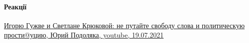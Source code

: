  
 
 
 
 
\paragraph{Реакції}
\label{sec:14_07_2021.fb.krjukova_svetlana.1.statja_putina_mnenie.reakcii}

\href{https://www.youtube.com/watch?v=gLKuHECGVM8}{%
Игорю Гужве и Светлане Крюковой: не путайте свободу слова и политическую прости@уцию,%
Юрий Подоляка, youtube, 19.07.2021%
}
